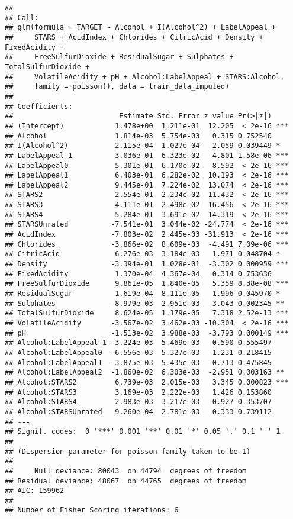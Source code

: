 \documentclass[
]{article}
\begin{document}
\begin{verbatim}
## 
## Call:
## glm(formula = TARGET ~ Alcohol + I(Alcohol^2) + LabelAppeal + 
##     STARS + AcidIndex + Chlorides + CitricAcid + Density + FixedAcidity + 
##     FreeSulfurDioxide + ResidualSugar + Sulphates + TotalSulfurDioxide + 
##     VolatileAcidity + pH + Alcohol:LabelAppeal + STARS:Alcohol, 
##     family = poisson(), data = train_data_imputed)
## 
## Coefficients:
##                         Estimate Std. Error z value Pr(>|z|)    
## (Intercept)            1.478e+00  1.211e-01  12.205  < 2e-16 ***
## Alcohol                1.814e-03  5.754e-03   0.315 0.752540    
## I(Alcohol^2)           2.115e-04  1.027e-04   2.059 0.039449 *  
## LabelAppeal-1          3.036e-01  6.323e-02   4.801 1.58e-06 ***
## LabelAppeal0           5.301e-01  6.170e-02   8.592  < 2e-16 ***
## LabelAppeal1           6.403e-01  6.282e-02  10.193  < 2e-16 ***
## LabelAppeal2           9.445e-01  7.224e-02  13.074  < 2e-16 ***
## STARS2                 2.554e-01  2.234e-02  11.432  < 2e-16 ***
## STARS3                 4.111e-01  2.498e-02  16.456  < 2e-16 ***
## STARS4                 5.284e-01  3.691e-02  14.319  < 2e-16 ***
## STARSUnrated          -7.541e-01  3.044e-02 -24.774  < 2e-16 ***
## AcidIndex             -7.803e-02  2.445e-03 -31.913  < 2e-16 ***
## Chlorides             -3.866e-02  8.609e-03  -4.491 7.09e-06 ***
## CitricAcid             6.276e-03  3.184e-03   1.971 0.048704 *  
## Density               -3.394e-01  1.028e-01  -3.302 0.000959 ***
## FixedAcidity           1.370e-04  4.367e-04   0.314 0.753636    
## FreeSulfurDioxide      9.861e-05  1.840e-05   5.359 8.38e-08 ***
## ResidualSugar          1.619e-04  8.111e-05   1.996 0.045970 *  
## Sulphates             -8.979e-03  2.951e-03  -3.043 0.002345 ** 
## TotalSulfurDioxide     8.624e-05  1.179e-05   7.318 2.52e-13 ***
## VolatileAcidity       -3.567e-02  3.462e-03 -10.304  < 2e-16 ***
## pH                    -1.513e-02  3.988e-03  -3.793 0.000149 ***
## Alcohol:LabelAppeal-1 -3.224e-03  5.469e-03  -0.590 0.555497    
## Alcohol:LabelAppeal0  -6.556e-03  5.327e-03  -1.231 0.218415    
## Alcohol:LabelAppeal1  -3.875e-03  5.435e-03  -0.713 0.475845    
## Alcohol:LabelAppeal2  -1.860e-02  6.303e-03  -2.951 0.003163 ** 
## Alcohol:STARS2         6.739e-03  2.015e-03   3.345 0.000823 ***
## Alcohol:STARS3         3.169e-03  2.222e-03   1.426 0.153860    
## Alcohol:STARS4         2.983e-03  3.217e-03   0.927 0.353707    
## Alcohol:STARSUnrated   9.260e-04  2.781e-03   0.333 0.739112    
## ---
## Signif. codes:  0 '***' 0.001 '**' 0.01 '*' 0.05 '.' 0.1 ' ' 1
## 
## (Dispersion parameter for poisson family taken to be 1)
## 
##     Null deviance: 80043  on 44794  degrees of freedom
## Residual deviance: 48067  on 44765  degrees of freedom
## AIC: 159962
## 
## Number of Fisher Scoring iterations: 6
\end{verbatim}
\end{document}
